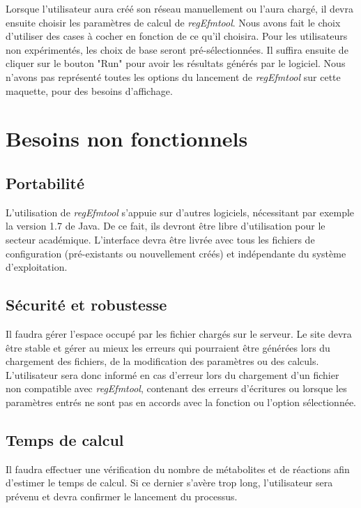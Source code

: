Lorsque l'utilisateur aura créé son réseau manuellement ou l'aura chargé, il devra ensuite choisir les paramètres de calcul de \textit{regEfmtool}. Nous avons fait le choix d'utiliser des cases à cocher en fonction de ce qu'il choisira. Pour les utilisateurs non expérimentés, les choix de base seront pré-sélectionnées. Il suffira ensuite de cliquer sur le bouton "Run" pour avoir les résultats générés par le logiciel. Nous n'avons pas représenté toutes les options du lancement de \textit{regEfmtool} sur cette maquette, pour des besoins d'affichage.

\pagebreak

\section{Besoins non fonctionnels}

\subsection{Portabilité}
L'utilisation de \textit{regEfmtool} s'appuie sur d'autres logiciels, nécessitant par exemple la version 1.7 de Java. De ce fait, ils devront être libre d'utilisation pour le secteur académique. L'interface devra être livrée avec tous les fichiers de configuration (pré-existants ou nouvellement créés) et indépendante du système d'exploitation. 

\subsection{Sécurité et robustesse}
Il faudra gérer l'espace occupé par les fichier chargés sur le serveur. Le site devra être stable et gérer au mieux les erreurs qui pourraient être générées lors du chargement des fichiers, de la modification des paramètres ou des calculs. L'utilisateur sera donc informé en cas d'erreur lors du chargement d'un fichier non compatible avec \textit{regEfmtool}, contenant des erreurs d'écritures ou lorsque les paramètres entrés ne sont pas en accords avec la fonction ou l'option sélectionnée. 

\subsection{Temps de calcul}
Il faudra effectuer une vérification du nombre de métabolites et de réactions afin d'estimer le temps de calcul. Si ce dernier s'avère trop long, l'utilisateur sera prévenu et devra confirmer le lancement du processus. 


